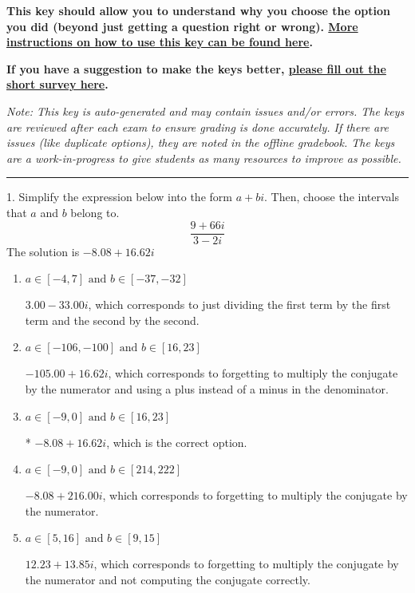 \documentclass{article}[14pt]
\begin{document}
\textbf{This key should allow you to understand why you choose the option you did (beyond just getting a question right or wrong). \href{https://xronos.clas.ufl.edu/mac1105spring2020/courseDescriptionAndMisc/Exams/LearningFromResults}{More instructions on how to use this key can be found here}.}

\textbf{If you have a suggestion to make the keys better, \href{https://forms.gle/CZkbZmPbC9XALEE88}{please fill out the short survey here}.}

\textit{Note: This key is auto-generated and may contain issues and/or errors. The keys are reviewed after each exam to ensure grading is done accurately. If there are issues (like duplicate options), they are noted in the offline gradebook. The keys are a work-in-progress to give students as many resources to improve as possible.}

\rule{\textwidth}{0.4pt}

1. Simplify the expression below into the form $a+bi$. Then, choose the intervals that $a$ and $b$ belong to.
$$ \frac{9  + 66 i}{3  - 2 i} $$ 
The solution is $ -8.08  + 16.62 i $ 

\begin{enumerate}[label=\Alph*.] 
\item $ a \in [-4, 7] \text{ and } b \in [-37, -32] $ 

  $3.00  - 33.00 i$, which corresponds to just dividing the first term by the first term and the second by the second. 
\item $ a \in [-106, -100] \text{ and } b \in [16, 23] $ 

  $-105.00  + 16.62 i$, which corresponds to forgetting to multiply the conjugate by the numerator and using a plus instead of a minus in the denominator. 
\item $ a \in [-9, 0] \text{ and } b \in [16, 23] $ 

 * $-8.08  + 16.62 i$, which is the correct option. 
\item $ a \in [-9, 0] \text{ and } b \in [214, 222] $ 

  $-8.08  + 216.00 i$, which corresponds to forgetting to multiply the conjugate by the numerator. 
\item $ a \in [5, 16] \text{ and } b \in [9, 15] $ 

  $12.23  + 13.85 i$, which corresponds to forgetting to multiply the conjugate by the numerator and not computing the conjugate correctly. 
\end{enumerate} 
 
\end{document}
